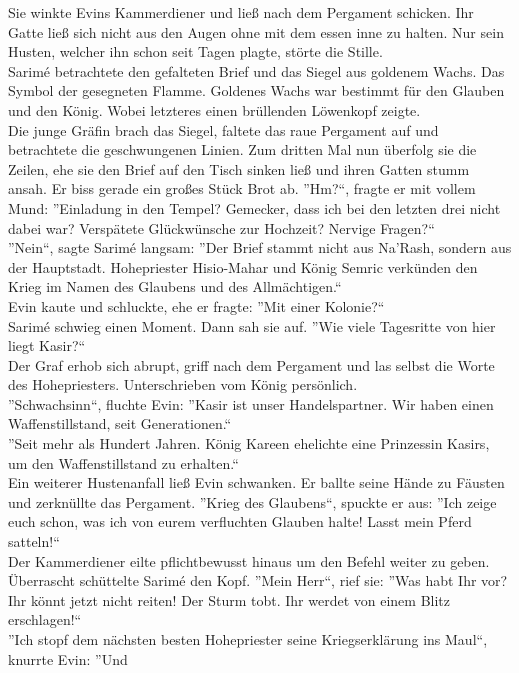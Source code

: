 Sie winkte Evins Kammerdiener und ließ nach dem Pergament schicken. Ihr Gatte ließ sich nicht aus 
den Augen ohne mit dem essen inne zu halten. Nur sein Husten, welcher ihn schon seit Tagen plagte, 
störte die Stille.\\
Sarimé betrachtete den gefalteten Brief und das Siegel aus goldenem Wachs. Das Symbol der 
gesegneten Flamme. Goldenes Wachs war bestimmt für den Glauben und den König. Wobei letzteres 
einen brüllenden Löwenkopf zeigte.\\
Die junge Gräfin brach das Siegel, faltete das raue Pergament auf und betrachtete die geschwungenen 
Linien. Zum dritten Mal nun überfolg sie die Zeilen, ehe sie den Brief auf den Tisch sinken ließ 
und ihren Gatten stumm ansah. Er biss gerade ein großes Stück Brot ab. ''Hm?``, fragte er mit 
vollem Mund: ''Einladung in den Tempel? Gemecker, dass ich bei den letzten drei nicht dabei war? 
Verspätete Glückwünsche zur Hochzeit? Nervige Fragen?``\\
''Nein``, sagte Sarimé langsam: ''Der Brief stammt nicht aus Na'Rash, sondern aus der Hauptstadt. 
Hohepriester Hisio-Mahar und König Semric verkünden den Krieg im Namen des Glaubens und des 
Allmächtigen.``\\
Evin kaute und schluckte, ehe er fragte: ''Mit einer Kolonie?``\\
Sarimé schwieg einen Moment. Dann sah sie auf. ''Wie viele Tagesritte von hier liegt Kasir?``\\
Der Graf erhob sich abrupt, griff nach dem Pergament und las selbst die Worte des Hohepriesters. 
Unterschrieben vom König persönlich.\\
''Schwachsinn``, fluchte Evin: ''Kasir ist unser Handelspartner. Wir haben einen Waffenstillstand, 
seit Generationen.``\\
''Seit mehr als Hundert Jahren. König Kareen ehelichte eine Prinzessin Kasirs, um den 
Waffenstillstand zu erhalten.``\\
Ein weiterer Hustenanfall ließ Evin schwanken. Er ballte seine Hände zu Fäusten und zerknüllte das 
Pergament. ''Krieg des Glaubens``, spuckte er aus: ''Ich zeige euch schon, was ich von eurem 
verfluchten Glauben halte! Lasst mein Pferd satteln!``\\
Der Kammerdiener eilte pflichtbewusst hinaus um den Befehl weiter zu geben. Überrascht schüttelte 
Sarimé den Kopf. ''Mein Herr``, rief sie: ''Was habt Ihr vor? Ihr könnt jetzt nicht reiten! Der 
Sturm tobt. Ihr werdet von einem Blitz erschlagen!``\\
''Ich stopf dem nächsten besten Hohepriester seine Kriegserklärung ins Maul``, knurrte Evin: ''Und 
